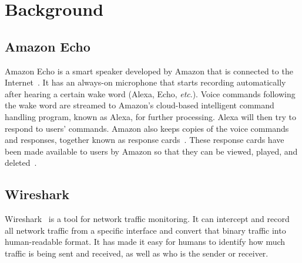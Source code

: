 \section{Background}
\subsection{Amazon Echo}
Amazon Echo is a smart speaker developed by Amazon that is connected to the Internet~\cite{wikipedia_2019}. It has an always-on microphone that starts recording automatically after hearing a certain wake word (Alexa, Echo, \textit{etc}.). Voice commands following the wake word are streamed to Amazon's cloud-based intelligent command handling program, known as Alexa, for further processing. Alexa will then try to respond to users' commands. Amazon also keeps copies of the voice commands and responses, together known as response cards~\cite{ford2019alexa}. These response cards have been made available to users by Amazon so that they can be viewed, played, and deleted~\cite{amazon_2010}.

\subsection{Wireshark}
Wireshark~\cite{wireshark_wiki} is a tool for network traffic monitoring. It can intercept and record all network traffic from a specific interface and convert that binary traffic into human-readable format. It has made it easy for humans to identify how much traffic is being sent and received, as well as who is the sender or receiver.